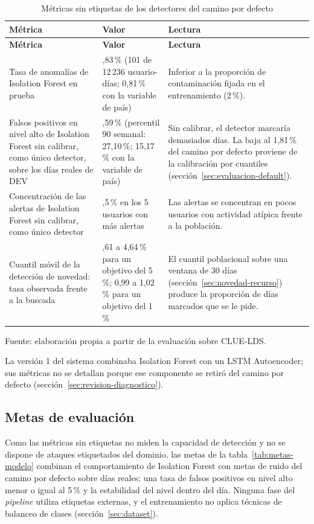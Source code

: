 \begin{longtable}{>{\raggedright\arraybackslash}p{5.2cm}>{\raggedright\arraybackslash}p{3.4cm}>{\raggedright\arraybackslash}p{5.5cm}}
	\caption{Métricas sin etiquetas de los detectores del camino por defecto}
	\label{tab:metricas-modelo}\\
	\hline
	\textbf{Métrica} & \textbf{Valor} & \textbf{Lectura} \\
	\hline
	\endfirsthead
	\hline
	\textbf{Métrica} & \textbf{Valor} & \textbf{Lectura} \\
	\hline
	\endhead
	Tasa de anomalías de Isolation Forest en prueba & 0,83\,\% (101 de 12\,236 usuario-días; 0,81\,\% con la variable de país) & Inferior a la proporción de contaminación fijada en el entrenamiento (2\,\%). \\
	\hline
	Falsos positivos en nivel alto de Isolation Forest sin calibrar, como único detector, sobre los días reales de DEV & 16,59\,\% (percentil 90 semanal: 27,10\,\%; 15,17\,\% con la variable de país) & Sin calibrar, el detector marcaría demasiados días. La baja al 1,81\,\% del camino por defecto proviene de la calibración por cuantiles (sección~\ref{sec:evaluacion-default}). \\
	\hline
	Concentración de las alertas de Isolation Forest sin calibrar, como único detector & 58,5\,\% en los 5 usuarios con más alertas & Las alertas se concentran en pocos usuarios con actividad atípica frente a la población. \\
	\hline
	Cuantil móvil de la detección de novedad: tasa observada frente a la buscada & 4,61 a 4,64\,\% para un objetivo del 5\,\%; 0,99 a 1,02\,\% para un objetivo del 1\,\% & El cuantil poblacional sobre una ventana de 30 días (sección~\ref{sec:novedad-recurso}) produce la proporción de días marcados que se le pide. \\
	\hline
\end{longtable}
{\small Fuente: elaboración propia a partir de la evaluación sobre CLUE-LDS.\par}

La versión 1 del sistema combinaba Isolation Forest con un LSTM Autoencoder; sus métricas no se detallan porque ese componente se retiró del camino por defecto (sección~\ref{sec:revision-diagnostico}).

\subsection{Metas de evaluación}\label{sec:metas-modelo}
Como las métricas sin etiquetas no miden la capacidad de detección y no se dispone de ataques etiquetados del dominio, las metas de la tabla~\ref{tab:metas-modelo} combinan el comportamiento de Isolation Forest con metas de ruido del camino por defecto sobre días reales: una tasa de falsos positivos en nivel alto menor o igual al 5\,\% y la estabilidad del nivel dentro del día. Ninguna fase del \emph{pipeline} utiliza etiquetas externas, y el entrenamiento no aplica técnicas de balanceo de clases (sección~\ref{sec:dataset}).

